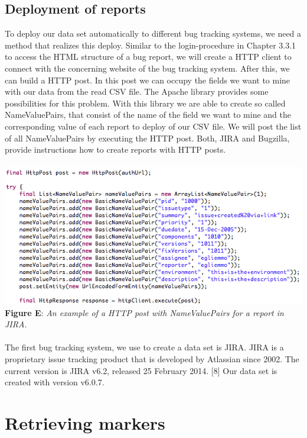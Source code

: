 \subsection{Deployment of reports} 
To deploy our data set automatically to different bug tracking systems, we need a method that realizes this deploy. Similar to the login-procedure in Chapter 3.3.1 to access the HTML structure of a bug report, we will create a HTTP client to connect with the concerning website of the bug tracking system. After this, we can build a HTTP post. In this post we can occupy the fields we want to mine with our data from the read CSV file. The Apache library provides some possibilities for this problem. With this library we are able to create so called NameValuePairs, that consist of the name of the field we want to mine and the corresponding value of each report to deploy of our CSV file. We will post the list of all NameValuePairs by executing the HTTP post. Both, JIRA and Bugzilla, provide instructions how to create reports with HTTP posts. 
\\ \\ \includegraphics[width=1.0\textwidth]{http-post.png}  \\\textbf{Figure E}: \textit{An example of a HTTP post with NameValuePairs for a report in JIRA.}  \\ \\  
The first bug tracking system, we use to create a data set is JIRA. JIRA is a proprietary issue tracking product that is developed by Atlassian since 2002. The current version is JIRA v6.2, released 25 February 2014. [8] Our data set is created with version v6.0.7.

\section{Retrieving markers}
\label{Retrieving markers}

